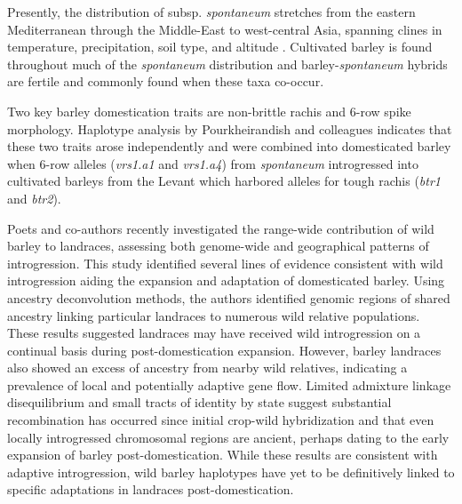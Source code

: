 \documentclass[11pt]{article}
\begin{document}
\begin{enumerate}
Presently, the distribution of subsp. \emph{spontaneum} stretches from the eastern Mediterranean through the Middle-East to west-central Asia, spanning clines in temperature, precipitation, soil type, and altitude \cite{Morrell2007}.
Cultivated barley is found throughout much of the \emph{spontaneum} distribution and barley-\emph{spontaneum} hybrids are fertile and commonly found when these taxa co-occur.

Two key barley domestication traits are non-brittle rachis and 6-row spike morphology.
Haplotype analysis by Pourkheirandish and colleagues \cite{pourkheirandish2018elucidation} indicates that these two traits arose independently and were combined into domesticated barley when 6-row alleles (\emph{vrs1.a1} and \emph{vrs1.a4}) from \emph{spontaneum} introgressed into cultivated barleys from the Levant which harbored alleles for tough rachis (\emph{btr1} and \emph{btr2}).

Poets and co-authors \cite{Poets2015} recently investigated the range-wide contribution of wild barley to landraces, assessing both genome-wide and geographical patterns of introgression.
This study identified several lines of evidence consistent with wild introgression aiding the expansion and adaptation of domesticated barley.
Using ancestry deconvolution methods, the authors identified genomic regions of shared ancestry linking particular landraces to numerous wild relative populations.
These results suggested landraces may have received wild introgression on a continual basis during post-domestication expansion.
However, barley landraces also showed an excess of ancestry from nearby wild relatives, indicating a prevalence of local and potentially adaptive gene flow.
Limited admixture linkage disequilibrium and small tracts of identity by state suggest substantial recombination has occurred since initial crop-wild hybridization and that even locally introgressed chromosomal regions are ancient, perhaps dating to the early expansion of barley post-domestication.
While these results are consistent with adaptive introgression, wild barley haplotypes have yet to be definitively linked to specific adaptations in landraces post-domestication.




\end{enumerate}
\end{document}
